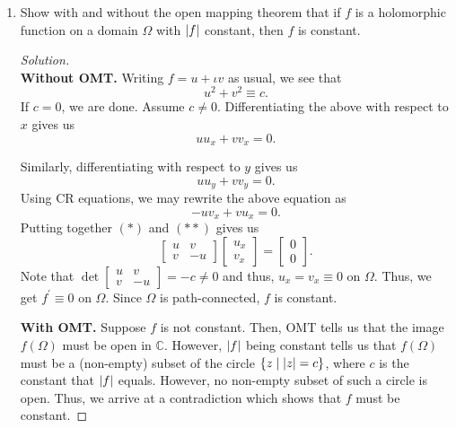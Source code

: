 \documentclass[11pt]{article}
\theoremstyle{definition}
\newenvironment{soln}{\begin{proof}[Solution]}{\end{proof}}
\begin{document}
\begin{enumerate}[leftmargin=*]
    \newpage
    
    \item Show with and without the open mapping theorem that if $f$ is a holomorphic function on a domain $\Omega$ with $\abs{f}$ constant, then $f$ is constant.
    
    \begin{soln}
        \phantom{hi}\\
        \textbf{Without OMT.} Writing $f = u + \iota v$ as usual, we see that
        \[
            u^2 + v^2 \equiv c.
        \]
        If $c = 0$, we are done. Assume $c \neq 0$. Differentiating the above with respect to $x$ gives us
        \begin{equation*}
            uu_x + vv_x = 0. \tag{$*$}
        \end{equation*}
            
        Similarly, differentiating with respect to $y$ gives us
        \[
            uu_y + vv_y = 0.
        \]
        Using CR equations, we may rewrite the above equation as
        \begin{equation*}
           -uv_x + vu_x = 0. \tag{$**$}
        \end{equation*}
        Putting together $(*)$ and $(**)$ gives us
        \[
            \begin{bmatrix}
                    u & v \\ v & -u
            \end{bmatrix} \begin{bmatrix}
                    u_x \\ v_x
            \end{bmatrix} = \begin{bmatrix}
                    0 \\ 0
            \end{bmatrix}.
        \]
        Note that $\det\begin{bmatrix}
                u & v \\ v & -u
        \end{bmatrix} = -c \neq 0$ and thus, $u_x = v_x \equiv 0$ on $\Omega$. Thus, we get $f^{\prime} \equiv 0$ on $\Omega$. Since $\Omega$ is path-connected, $f$ is constant.
        
        \textbf{With OMT.} Suppose $f$ is not constant. Then, OMT tells us that the image $f(\Omega)$ must be open in $\mathbb{C}$. However, $\abs{f}$ being constant tells us that $f(\Omega)$ must be a (non-empty) subset of the circle $\{z \mid \abs{z} = c \}$, where $c$ is the constant that $\abs{f}$ equals. However, no non-empty subset of such a circle is open. Thus, we arrive at a contradiction which shows that $f$ must be constant.
    \end{soln}
    

\end{enumerate}
\end{document}
